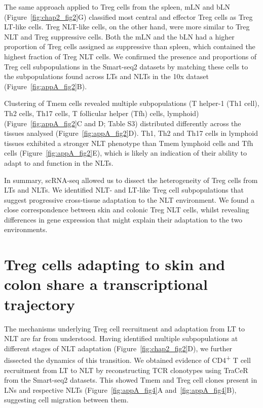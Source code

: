 The same approach applied to Treg cells from the spleen, mLN and bLN (Figure~\ref{fig:chap2_fig2}G) classified most central and effector Treg cells as Treg LT-like cells. Treg NLT-like cells, on the other hand, were more similar to Treg NLT and Treg suppressive cells. Both the mLN and the bLN had a higher proportion of Treg cells assigned as suppressive than spleen, which contained the highest fraction of Treg NLT cells. We confirmed the presence and proportions of Treg cell subpopulations in the Smart-seq2 datasets by matching these cells to the subpopulations found across LTs and NLTs in the 10x dataset (Figure~\ref{fig:appA_fig2}B).

Clustering of Tmem cells revealed multiple subpopulations (T helper-1 (Th1 cell), Th2 cells, Th17 cells, T follicular helper (Tfh) cells, lymphoid) (Figure~\ref{fig:appA_fig2}C and D; Table S3) distributed differently across the tissues analysed (Figure~\ref{fig:appA_fig2}D). Th1, Th2 and Th17 cells in lymphoid tissues exhibited a stronger NLT phenotype than Tmem lymphoid cells and Tfh cells (Figure~\ref{fig:appA_fig2}E), which is likely an indication of their ability to adapt to and function in the NLTs.

In summary, scRNA-seq allowed us to dissect the heterogeneity of Treg cells from LTs and NLTs. We identified NLT- and LT-like Treg cell subpopulations that suggest progressive cross-tissue adaptation to the NLT environment. We found a close correspondence between skin and colonic Treg NLT cells, whilst revealing differences in gene expression that might explain their adaptation to the two environments.


\section{Treg cells adapting to skin and colon share a transcriptional trajectory}
\label{section2.4}
The mechanisms underlying Treg cell recruitment and adaptation from LT to NLT are far from understood. Having identified multiple subpopulations at different stages of NLT adaptation (Figure~\ref{fig:chap2_fig2}D), we further dissected the dynamics of this transition. We obtained evidence of CD4\textsuperscript{+} T cell recruitment from LT to NLT by reconstructing TCR clonotypes using TraCeR~\citep{stubbington_t_2016} from the Smart-seq2 datasets. This showed Tmem and Treg cell clones present in LNs and respective NLTs (Figure~\ref{fig:appA_fig4}A and~\ref{fig:appA_fig4}B), suggesting cell migration between them.

